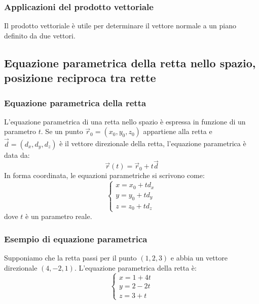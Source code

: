 \documentclass{article}
\begin{document}
\subsubsection{Applicazioni del prodotto vettoriale}
Il prodotto vettoriale è utile per determinare il vettore normale a un piano definito da due
vettori.


\newpage
\subsection{Equazione parametrica della retta nello spazio, posizione reciproca tra rette}

\subsubsection{Equazione parametrica della retta}
L'equazione parametrica di una retta nello spazio è espressa in funzione di un parametro
\( t \). Se un punto \( \vec{r}_0 = (x_0, y_0, z_0) \) appartiene alla retta e
\( \vec{d} = (d_x, d_y, d_z) \) è il vettore direzionale della retta,
l'equazione parametrica è data da:
\[
    \vec{r}(t) = \vec{r}_0 + t \vec{d}
\]
In forma coordinata, le equazioni parametriche si scrivono come:
\[
    \begin{cases}
        x = x_0 + t d_x \\
        y = y_0 + t d_y \\
        z = z_0 + t d_z
    \end{cases}
\]
dove \( t \) è un parametro reale.

\subsubsection{Esempio di equazione parametrica}
Supponiamo che la retta passi per il punto \( (1, 2, 3) \) e abbia un vettore direzionale \( (4, -2, 1) \). L'equazione parametrica della retta è:
\[
    \begin{cases}
        x = 1 + 4t \\
        y = 2 - 2t \\
        z = 3 + t
    \end{cases}
\]
\end{document}
